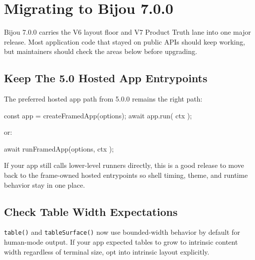 \chapter{Migrating to Bijou 7.0.0}\label{record-270}

\smallskip

Bijou 7.0.0 carries the V6 layout floor and V7 Product Truth lane into one major release. Most application code that stayed on public APIs should keep working, but maintainers should check the areas below before upgrading.

\section{Keep The 5.0 Hosted App Entrypoints}\label{record-270-keep-the-5.0-hosted-app-entrypoints}

The preferred hosted app path from 5.0.0 remains the right path:

\begin{CodeBlock}
const app = createFramedApp(options);
await app.run({ ctx });
\end{CodeBlock}

or:

\begin{CodeBlock}
await runFramedApp(options, { ctx });
\end{CodeBlock}

If your app still calls lower-level runners directly, this is a good release to move back to the frame-owned hosted entrypoints so shell timing, theme, and runtime behavior stay in one place.

\section{Check Table Width Expectations}\label{record-270-check-table-width-expectations}

\texttt{t\allowbreak{}a\allowbreak{}b\allowbreak{}l\allowbreak{}e\allowbreak{}(\allowbreak{})} and \texttt{t\allowbreak{}a\allowbreak{}b\allowbreak{}l\allowbreak{}e\allowbreak{}S\allowbreak{}u\allowbreak{}r\allowbreak{}f\allowbreak{}a\allowbreak{}c\allowbreak{}e\allowbreak{}(\allowbreak{})} now use bounded-width behavior by default for human-mode output. If your app expected tables to grow to intrinsic content width regardless of terminal size, opt into intrinsic layout explicitly.

